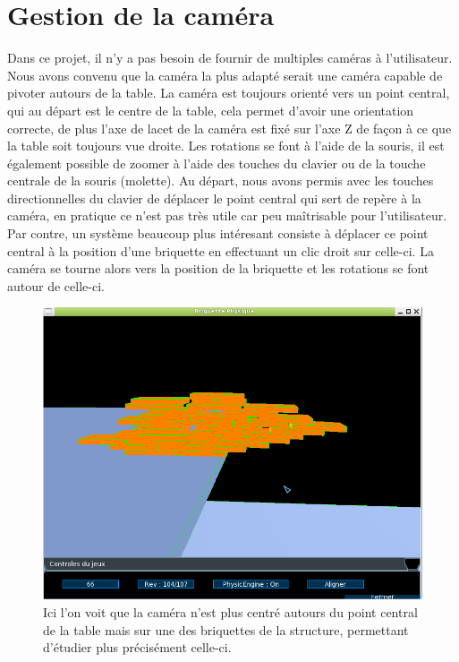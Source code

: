 \documentclass[frenchb,twoside]{EPURapport}
\begin{document}
    \section{Gestion de la caméra}
        Dans ce projet, il n'y a pas besoin de fournir de multiples caméras à
        l'utilisateur. Nous avons convenu que la caméra la plus adapté serait
        une caméra capable de pivoter autours de la table. La caméra est
        toujours orienté vers un point central, qui au départ est le centre de
        la table, cela permet d'avoir une orientation correcte, de plus l'axe
        de lacet de la caméra est fixé sur l'axe Z de façon à ce que la table
        soit toujours vue droite. Les rotations se font à l'aide de la souris,
        il est également possible de zoomer à l'aide des touches du clavier
         ou de la touche centrale de la souris (molette).
        Au départ, nous avons permis avec les touches directionnelles du clavier de
        déplacer le point central qui sert de repère à la caméra, en pratique
        ce n'est pas très utile car peu maîtrisable pour l'utilisateur. Par
        contre, un système beaucoup plus intéresant consiste à déplacer ce point
        central à la position d'une briquette en effectuant un clic droit sur
        celle-ci. La caméra se tourne alors vers la position de la briquette et les rotations
        se font autour de celle-ci.

    \begin{figure}[h]
		\centering
        \includegraphics[scale=0.75]{images/bon_score.png}
        \caption{\label{fig:bon_score}Ici l'on voit que la caméra n'est plus centré autours du point
        central de la table mais sur une des briquettes de la structure,
        permettant d'étudier plus précisément celle-ci.}
    \end{figure}
\end{document}
